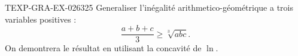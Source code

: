 \begin{exercice}{TEXP-GRA-EX-026}{3}{25}
Generaliser l'inégalité arithmetico-géométrique a trois variables positives :
\[ \frac{a+b+c}{3} \geq \sqrt[3]{abc}. \]
On demontrera le résultat en utilisant la concavité de $\ln$.

\end{exercice}
